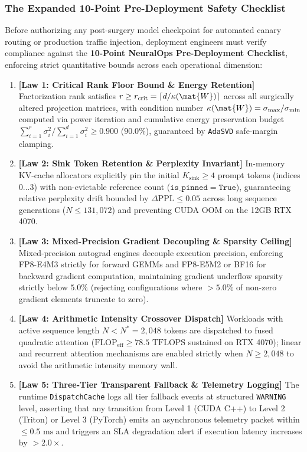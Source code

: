 \subsubsection{The Expanded 10-Point Pre-Deployment Safety Checklist}
\label{sec:deployment_checklist}

Before authorizing any post-surgery model checkpoint for automated canary routing or production traffic injection, deployment engineers must verify compliance against the \textbf{10-Point NeuralOps Pre-Deployment Checklist}, enforcing strict quantitative bounds across each operational dimension:

\begin{enumerate}
    \item \textbf{[Law 1: Critical Rank Floor Bound \& Energy Retention]} Factorization rank satisfies $r \ge r_{\text{crit}} = \lceil d / \kappa(\mat{W}) \rceil$ across all surgically altered projection matrices, with condition number $\kappa(\mat{W}) = \sigma_{\max} / \sigma_{\min}$ computed via power iteration and cumulative energy preservation budget $\sum_{i=1}^r \sigma_i^2 / \sum_{i=1}^d \sigma_i^2 \ge 0.900$ ($90.0\%$), guaranteed by \texttt{AdaSVD} safe-margin clamping.
    \item \textbf{[Law 2: Sink Token Retention \& Perplexity Invariant]} In-memory KV-cache allocators explicitly pin the initial $K_{\text{sink}} \ge 4$ prompt tokens (indices $0 \dots 3$) with non-evictable reference count ($\mathtt{is\_pinned = True}$), guaranteeing relative perplexity drift bounded by $\Delta \text{PPL} \le 0.05$ across long sequence generations ($N \le 131{,}072$) and preventing CUDA OOM on the 12GB RTX 4070.
    \item \textbf{[Law 3: Mixed-Precision Gradient Decoupling \& Sparsity Ceiling]} Mixed-precision autograd engines decouple execution precision, enforcing FP8-E4M3 strictly for forward GEMMs and FP8-E5M2 or BF16 for backward gradient computation, maintaining gradient underflow sparsity strictly below $5.0\%$ (rejecting configurations where $>5.0\%$ of non-zero gradient elements truncate to zero).
    \item \textbf{[Law 4: Arithmetic Intensity Crossover Dispatch]} Workloads with active sequence length $N < N^* = 2{,}048$ tokens are dispatched to fused quadratic attention ($\text{FLOP}_{\text{eff}} \ge 78.5\text{ TFLOPS}$ sustained on RTX 4070); linear and recurrent attention mechanisms are enabled strictly when $N \ge 2{,}048$ to avoid the arithmetic intensity memory wall.
    \item \textbf{[Law 5: Three-Tier Transparent Fallback \& Telemetry Logging]} The runtime \texttt{DispatchCache} logs all tier fallback events at structured \texttt{WARNING} level, asserting that any transition from Level 1 (CUDA C++) to Level 2 (Triton) or Level 3 (PyTorch) emits an asynchronous telemetry packet within $\le 0.5\text{ ms}$ and triggers an SLA degradation alert if execution latency increases by $>2.0\times$.

\end{enumerate}
